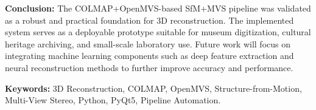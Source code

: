\vspace{0.3cm}

\noindent\textbf{Conclusion:}
The COLMAP+OpenMVS-based SfM+MVS pipeline was validated as a robust and practical
foundation for 3D reconstruction. The implemented system serves as a deployable prototype
suitable for museum digitization, cultural heritage archiving, and small-scale laboratory use.
Future work will focus on integrating machine learning components such as deep feature
extraction and neural reconstruction methods to further improve accuracy and performance.

\vspace{0.3cm}

\noindent\textbf{Keywords:}
3D Reconstruction, COLMAP, OpenMVS, Structure-from-Motion, Multi-View Stereo, Python, PyQt5, Pipeline Automation.
